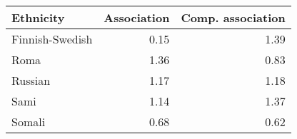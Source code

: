 \begin{tabular}{lrr}
\toprule
      Ethnicity &  Association &  Comp. association \\
\midrule
Finnish-Swedish &         0.15 &               1.39 \\
           Roma &         1.36 &               0.83 \\
        Russian &         1.17 &               1.18 \\
           Sami &         1.14 &               1.37 \\
         Somali &         0.68 &               0.62 \\
\bottomrule
\end{tabular}
